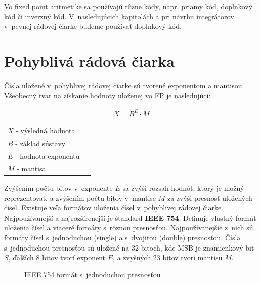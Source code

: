 Vo fixed point aritmetike sa používajú rôzne kódy, napr. priamy kód, doplnkový kód či inverzný kód. V~nasledujúcich kapitolách a pri návrhu integrátorov v~pevnej rádovej čiarke budeme používať doplnkový kód. 

\newpage
\section{Pohyblivá rádová čiarka}
Čísla uložené v~pohyblivej rádovej čiarke sú tvorené exponentom a mantisou. Všeobecný tvar na získanie hodnoty uloženej vo FP je nasledujúci:

\begin{eqnarray}
X = B^{E}\cdot M
\end{eqnarray}

\begin{tabular}{ll}
$ X $ - výsledná hodnota \\
$ B $ - základ sústavy \\
$ E $ - hodnota exponentu \\
$ M $ - mantisa \\
\end{tabular}
\bigskip

Zvýšením počtu bitov v~exponente $ E $ sa zvýši rozsah hodnôt, ktorý je možný reprezentovať, a zvýšením počtu bitov v~mantise $ M $ za zvýši presnosť uložených čísel. Existuje veľa formátov uloženia čísel v~pohyblivej rádovej čiarke. Najpoužívanejší a najrozšírenejší je štandard \textbf{IEEE 754}. Definuje vlastný formát uloženia čísel a viaceré formáty s~rôznou presnosťou. Najpoužívanejšie z~nich sú formáty čísel s~jednoduchou (single) a s~dvojitou (double) presnosťou. Čísla s~jednoduchou presnosťou sú uložené na 32 bitoch, kde MSB je znamienkový bit $ S $, ďalších 8 bitov tvorí exponent $ E $, a zvyšných 23 bitov tvorí mantisu $ M $.

\bigskip
\begin{figure}[h]
\centering
{}
\caption{IEEE 754 formát s~jednoduchou presnosťou}
\label{formatFP32}
\end{figure}


